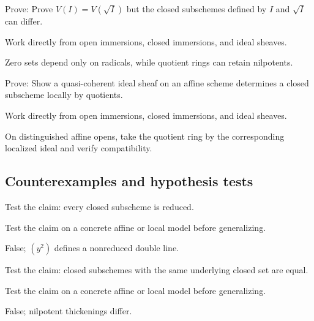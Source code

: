 \begin{exercise}\label{exr:vi22-expand-08}
Prove: Prove $V(I)=V(\sqrt I)$ but the closed subschemes defined by $I$ and $\sqrt I$ can differ.
\end{exercise}
\begin{hint}
Work directly from open immersions, closed immersions, and ideal sheaves.
\end{hint}
\begin{solution}
Zero sets depend only on radicals, while quotient rings can retain nilpotents.
\end{solution}

\begin{exercise}\label{exr:vi22-expand-09}
Prove: Show a quasi-coherent ideal sheaf on an affine scheme determines a closed subscheme locally by quotients.
\end{exercise}
\begin{hint}
Work directly from open immersions, closed immersions, and ideal sheaves.
\end{hint}
\begin{solution}
On distinguished affine opens, take the quotient ring by the corresponding localized ideal and verify compatibility.
\end{solution}

\subsection*{Counterexamples and hypothesis tests}

\begin{exercise}\label{exr:vi22-expand-10}
Test the claim: every closed subscheme is reduced.
\end{exercise}
\begin{hint}
Test the claim on a concrete affine or local model before generalizing.
\end{hint}
\begin{solution}
False; $(y^2)$ defines a nonreduced double line.
\end{solution}

\begin{exercise}\label{exr:vi22-expand-11}
Test the claim: closed subschemes with the same underlying closed set are equal.
\end{exercise}
\begin{hint}
Test the claim on a concrete affine or local model before generalizing.
\end{hint}
\begin{solution}
False; nilpotent thickenings differ.
\end{solution}

